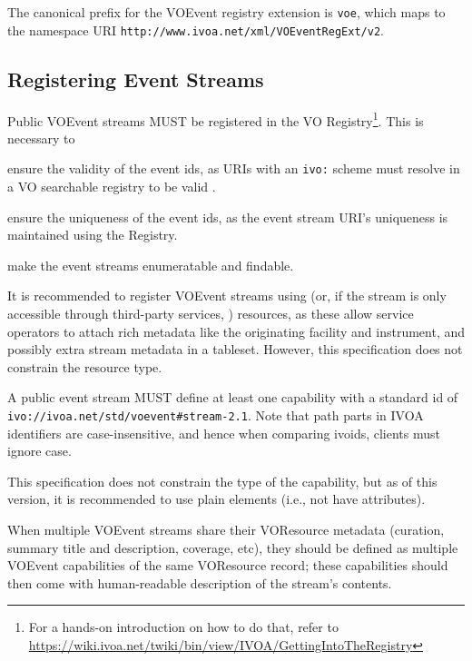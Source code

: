 \documentclass[11pt,a4paper]{ivoa}
\begin{document}
The canonical prefix for the VOEvent registry extension is \verb|voe|,
which maps to the namespace URI
\nolinkurl{http://www.ivoa.net/xml/VOEventRegExt/v2}.

\subsection{Registering Event Streams}
\label{sec:registering}

Public VOEvent streams MUST be registered in the VO
Registry\footnote{For a hands-on introduction on how to do that, refer
to
\url{https://wiki.ivoa.net/twiki/bin/view/IVOA/GettingIntoTheRegistry}}.
This is necessary to

\begin{compactitem}
\item ensure the validity of the event ids, as URIs with an \verb|ivo:|
scheme must resolve in a VO searchable registry to be valid
\citep{2016ivoa.spec.0523D}.
\item ensure the uniqueness of the event ids, as the event stream URI's
uniqueness is maintained using the Registry.
\item make the event streams enumeratable and findable.
\end{compactitem}

It is recommended to register VOEvent streams using
 (or, if the stream is only accessible through
third-party services, )
resources, as these allow service operators
to attach rich metadata like the originating facility and instrument, and
possibly extra stream metadata in a tableset.  However, this
specification does not constrain the resource type.

A public event stream MUST define at least one capability with a standard id of
\nolinkurl{ivo://ivoa.net/std/voevent#stream-2.1}.
Note that path parts in IVOA identifiers are case-insensitive, and hence
when comparing ivoids, clients must ignore case.

This specification does not constrain the type of the capability, but as
of this version, it is recommended to use plain 
elements (i.e., not have  attributes).

When multiple VOEvent streams share their VOResource metadata (curation,
summary title and description, coverage, etc), they should be defined as
multiple VOEvent capabilities of the same VOResource record; these
capabilities should then come with human-readable description of the
stream's contents.
\end{document}
